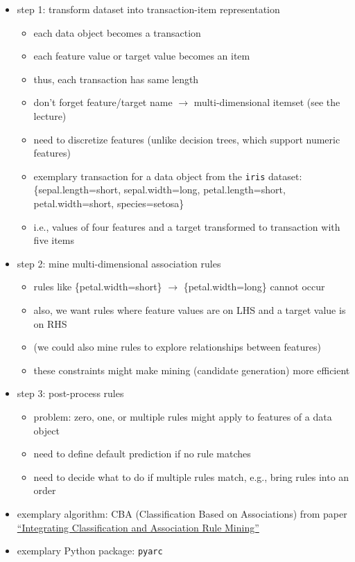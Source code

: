 \documentclass[12pt]{article}
\newcommand{\code}[1]{\textcolor{kitgreen}{\texttt{#1}}}
\begin{document}
\begin{itemize}[left=0pt, nosep]
	\begin{itemize}[left=0pt, nosep]
		\item step 1: transform dataset into transaction-item representation
		\begin{itemize}[left=0pt, nosep]
			\item each data object becomes a transaction
			\item each feature value or target value becomes an item
			\item thus, each transaction has same length
			\item don't forget feature/target name $\rightarrow$ multi-dimensional itemset (see the lecture)
			\item need to discretize features (unlike decision trees, which support numeric features)
			\item exemplary transaction for a data object from the \code{iris} dataset: \{sepal.length=short, sepal.width=long, petal.length=short, petal.width=short, species=setosa\}
			\item i.e., values of four features and a target transformed to transaction with five items
		\end{itemize}
		\item step 2: mine multi-dimensional association rules
		\begin{itemize}[left=0pt, nosep]
			\item rules like \{petal.width=short\} $\rightarrow$ \{petal.width=long\} cannot occur
			\item also, we want rules where feature values are on LHS and a target value is on RHS
			\item (we could also mine rules to explore relationships between features)
			\item these constraints might make mining (candidate generation) more efficient
		\end{itemize}
		\item step 3: post-process rules
		\begin{itemize}[left=0pt, nosep]
			\item problem: zero, one, or multiple rules might apply to features of a data object
			\item need to define default prediction if no rule matches
			\item need to decide what to do if multiple rules match, e.g., bring rules into an order
		\end{itemize}
		\item exemplary algorithm: CBA (Classification Based on Associations) from paper \href{https://www.aaai.org/Papers/KDD/1998/KDD98-012.pdf}{``Integrating Classification and Association Rule Mining''}
		\item exemplary Python package: \code{pyarc}
	\end{itemize}
\end{itemize}
\end{document}
